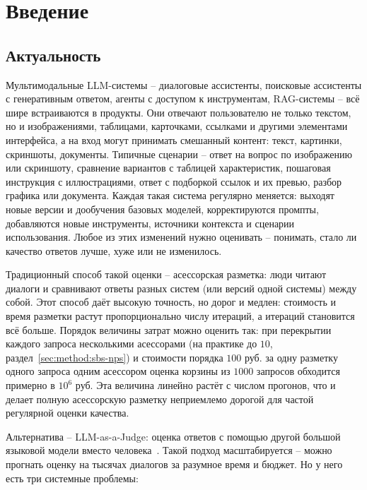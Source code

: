 \chapter{Введение}
\label{sec:intro}

\section{Актуальность}
\label{sec:intro:motivation}

Мультимодальные LLM-системы -- диалоговые ассистенты, поисковые
ассистенты с генеративным ответом, агенты с доступом к инструментам,
RAG-системы -- всё шире встраиваются в продукты.
Они отвечают пользователю не только текстом, но и изображениями,
таблицами, карточками, ссылками и другими элементами интерфейса, а на
вход могут принимать смешанный контент: текст, картинки, скриншоты,
документы.
Типичные сценарии -- ответ на вопрос по изображению или скриншоту,
сравнение вариантов с таблицей характеристик, пошаговая инструкция с
иллюстрациями, ответ с подборкой ссылок и их превью, разбор графика или
документа.
Каждая такая система регулярно меняется: выходят новые версии и
дообучения базовых моделей, корректируются промпты, добавляются новые
инструменты, источники контекста и сценарии использования.
Любое из этих изменений нужно оценивать -- понимать, стало ли качество
ответов лучше, хуже или не изменилось.

Традиционный способ такой оценки -- асессорская разметка: люди читают
диалоги и сравнивают ответы разных систем (или версий одной системы)
между собой.
Этот способ даёт высокую точность, но дорог и медлен: стоимость и
время разметки растут пропорционально числу итераций, а итераций
становится всё больше.
Порядок величины затрат можно оценить так: при перекрытии каждого
запроса несколькими асессорами (на практике до $10$,
раздел~\ref{sec:method:sbs-nps}) и стоимости порядка $100$ руб. за одну
разметку одного запроса одним асессором оценка корзины из $1000$
запросов обходится примерно в $10^6$ руб.
Эта величина линейно растёт с числом прогонов, что и делает полную
асессорскую разметку неприемлемо дорогой для частой регулярной оценки
качества.

Альтернатива -- LLM-as-a-Judge: оценка ответов с помощью другой
большой языковой модели вместо человека~\cite{zheng2023mtbench}.
Такой подход масштабируется -- можно прогнать оценку на тысячах
диалогов за разумное время и бюджет.
Но у него есть три системные проблемы:

